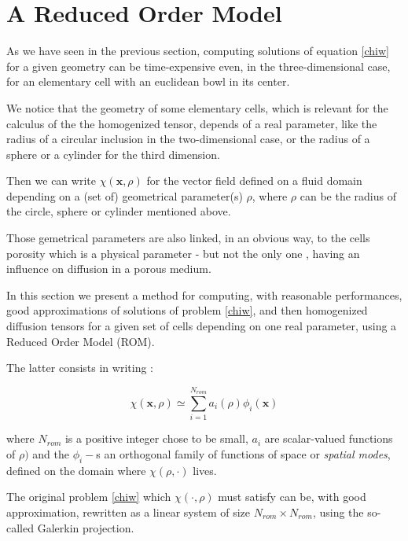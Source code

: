 \section{A Reduced Order Model}\label{rom}

As we have seen in the previous section, computing solutions of equation \ref{chiw} for a given geometry %
can be time-expensive even, in the three-dimensional case, for an elementary cell with an euclidean bowl in its center.

\par
We notice that the geometry of some elementary cells, which is relevant for the calculus of the the homogenized tensor, %
depends of a real parameter, like the radius of a circular inclusion in the two-dimensional case, %
or the radius of a sphere or a cylinder for the third dimension.

\par
Then we can write $\chi(\mathbf{x},\rho)$ for the vector field defined on a fluid domain depending on a (set of) geometrical parameter(s) $\rho$, %
where $\rho$ can be the radius of the circle, sphere or cylinder mentioned above.

\par
Those gemetrical parameters are also linked, in an obvious way, to the cells porosity which is a physical parameter - but not the only one , %
having an influence on diffusion in a porous medium.

\par
In this section we present a method for computing, with reasonable performances, good approximations of solutions of problem \ref{chiw}, %
and then homogenized diffusion tensors for a given set of cells depending on one real parameter, using a Reduced Order Model (ROM).

\etoile
The latter consists in writing :

\begin{equation}
\label{rom_chi}
\chi(\mathbf{x},\rho)\simeq \sum\limits_{i=1}^{N_{rom}}a_i(\rho )\phi_i(\mathbf{x})
\end{equation}

where $N_{rom}$ is a positive integer chose to be small, $a_i$ are scalar-valued functions of $\rho )$ %
and the $\phi_i -$s an orthogonal family of functions of space or \emph{spatial modes}, defined on the domain where $\chi (\rho ,\cdot)$ lives.

\par
The original problem \ref{chiw} which $\chi (\cdot,\rho )$ must satisfy can be, with good approximation, rewritten as a linear system of size $N_{rom}\times N_{rom}$, %
using the so-called Galerkin projection.

